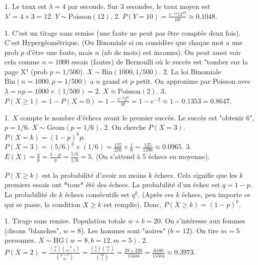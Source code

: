 \begin{correctionbox}
1. Le taux est $\lambda=4$ par seconde. Sur 3 secondes, le taux moyen est $\lambda' = 4 \times 3 = 12$.
$Y \sim \text{Poisson}(12)$.
2. $P(Y=10) = \frac{e^{-12} 12^{10}}{10!} \approx 0.1048$.
\end{correctionbox}

\begin{correctionbox}
1. C'est un tirage sans remise (une faute ne peut pas être comptée deux fois). C'est $\text{Hypergéométrique}$. (Ou $\text{Binomiale}$ si on considère que chaque mot a une prob $p$ d'être une faute, mais $n$ (nb de mots) est inconnu).
On peut aussi voir cela comme $n=1000$ essais (fautes) de Bernoulli où le succès est "tomber sur la page X" (prob $p=1/500$). $X \sim \text{Bin}(1000, 1/500)$.
2. La loi Binomiale $\text{Bin}(n=1000, p=1/500)$ a $n$ grand et $p$ petit.
On approxime par Poisson avec $\lambda = np = 1000 \times (1/500) = 2$.
$X \approx \text{Poisson}(2)$.
3. $P(X \ge 1) = 1 - P(X=0) = 1 - \frac{e^{-2} 2^0}{0!} = 1 - e^{-2} \approx 1 - 0.1353 = 0.8647$.
\end{correctionbox}

\begin{correctionbox}
1. $X$ compte le nombre d'échecs avant le premier succès. Le succès est "obtenir 6", $p=1/6$.
$X \sim \text{Geom}(p=1/6)$.
2. On cherche $P(X=3)$. $P(X=k) = (1-p)^k p$.
$P(X=3) = (5/6)^3 \times (1/6) = \frac{125}{216} \times \frac{1}{6} = \frac{125}{1296} \approx 0.0965$.
3. $E(X) = \frac{q}{p} = \frac{1-p}{p} = \frac{5/6}{1/6} = 5$. (On s'attend à 5 échecs en moyenne).
\end{correctionbox}

\begin{correctionbox}
$P(X \ge k)$ est la probabilité d'avoir au moins $k$ échecs.
Cela signifie que les $k$ premiers essais ont *tous* été des échecs.
La probabilité d'un échec est $q=1-p$. La probabilité de $k$ échecs consécutifs est $q^k$.
(Après ces $k$ échecs, peu importe ce qui se passe, la condition $X \ge k$ est remplie).
Donc, $P(X \ge k) = (1-p)^k$.
\end{correctionbox}

\begin{correctionbox}
1. Tirage sans remise. Population totale $w+b = 20$. On s'intéresse aux femmes (disons "blanches", $w=8$). Les hommes sont "noires" ($b=12$). On tire $m=5$ personnes.
$X \sim \text{HG}(w=8, b=12, m=5)$.
2. $P(X=2) = \frac{\binom{w}{k} \binom{b}{m-k}}{\binom{w+b}{m}} = \frac{\binom{8}{2} \binom{12}{3}}{\binom{20}{5}} = \frac{28 \times 220}{15504} = \frac{6160}{15504} \approx 0.3973$.
\end{correctionbox}

